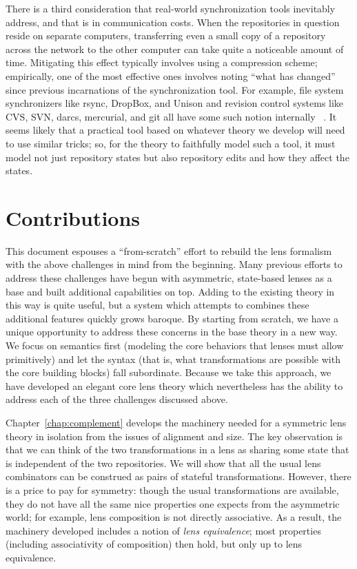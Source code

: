 There is a third consideration that real-world synchronization tools
inevitably address, and that is in communication costs. When the
repositories in question reside on separate computers, transferring even a
small copy of a repository across the network to the other computer can
take quite a noticeable amount of time. Mitigating this effect typically
involves using a compression scheme; empirically, one of the most effective
ones involves noting ``what has changed'' since previous incarnations of the
synchronization tool. For example, file system synchronizers like rsync,
DropBox, and Unison and revision control systems like CVS, SVN, darcs,
mercurial, and git all have some such notion internally~%
\cite{Tridgell96rsync,dropbox,pierce2004unison,berliner1990cvs,subversion,darcs,mercurial,git}.
It seems likely that a practical tool based on whatever theory we develop
will need to use similar tricks; so, for the theory to faithfully model such
a tool, it must model not just repository states but also repository edits
and how they affect the states.

\section{Contributions}
\label{sec:intro-contributions}
This document espouses a ``from-scratch'' effort to rebuild the lens
formalism with the above challenges in mind from the beginning. Many
previous efforts to address these challenges have begun with asymmetric,
state-based lenses as a base and built additional capabilities on top.
Adding to the existing theory in this way is quite useful, but a system
which attempts to combines these additional features quickly grows baroque.
By starting from scratch, we have a unique opportunity to address these
concerns in the base theory in a new way. We focus on semantics first
(modeling the core behaviors that lenses must allow primitively) and let the
syntax (that is, what transformations are possible with the core building
blocks) fall subordinate. Because we take this approach, we have developed
an elegant core lens theory which nevertheless has the ability to address
each of the three challenges discussed above.

Chapter~\ref{chap:complement} develops the machinery needed for a symmetric
lens theory in isolation from the issues of alignment and size. The key
observation is that we can think of the two transformations in a lens as
sharing some state that is independent of the two repositories. We will show
that all the usual lens combinators can be construed as pairs of stateful
transformations. However, there is a price to pay for symmetry: though the
usual transformations are available, they do not have all the same nice
properties one expects from the asymmetric world; for example, lens
composition is not directly associative. As a result, the machinery
developed includes a notion of \emph{lens equivalence}; most properties
(including associativity of composition) then hold, but only up to lens
equivalence.

